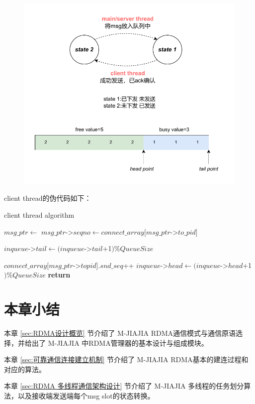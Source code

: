 {    \begin{figure}[H]
        \centering
        \includegraphics[width=1.0\textwidth]{Img/send_state.drawio.pdf}
    \end{figure}

    client thread的伪代码如下：
    \begin{algorithm}
        \caption{client thread algorithm}
        \begin{algorithmic}[1] %
            \State {}
            \State $msg\_ptr \gets$ 
            \State $msg\_ptr$->$seqno \gets connect\_array[msg\_ptr$->$to\_pid]$

            \State
            \State {}
            \State {}
            \State {}
            \State $inqueue$->$tail \gets (inqueue$->$tail$+1$) \%QueueSize$
            \Else
            \EndWhile
            \EndIf

            \State
            \State $connect\_array[msg\_ptr$->$topid].snd\_seq$++
            \State $inqueue$->$head \gets (inqueue$->$head$+1$) \% QueueSize$
            \State {}
            \EndWhile
            \State \textbf{return}
            \EndProcedure
        \end{algorithmic}
    \end{algorithm}

    \section{本章小结}
    本章 \ref{sec:RDMA设计概览} 节介绍了 M-JIAJIA RDMA通信模式与通信原语选择，并给出了 M-JIAJIA 中RDMA管理器的基本设计与组成模块。

    本章 \ref{sec:可靠通信连接建立机制} 节介绍了 M-JIAJIA RDMA基本的建连过程和对应的算法。

    本章 \ref{sec:RDMA 多线程通信架构设计} 节介绍了 M-JIAJIA 多线程的任务划分算法，以及接收端发送端每个msg slot的状态转换。
}